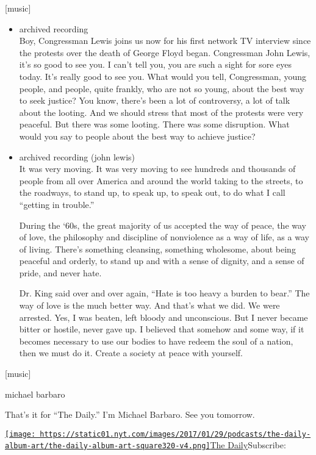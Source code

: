 {[}music{]}

\begin{itemize}
\item
  archived recording\\
  Boy, Congressman Lewis joins us now for his first network TV interview
  since the protests over the death of George Floyd began. Congressman
  John Lewis, it's so good to see you. I can't tell you, you are such a
  sight for sore eyes today. It's really good to see you. What would you
  tell, Congressman, young people, and people, quite frankly, who are
  not so young, about the best way to seek justice? You know, there's
  been a lot of controversy, a lot of talk about the looting. And we
  should stress that most of the protests were very peaceful. But there
  was some looting. There was some disruption. What would you say to
  people about the best way to achieve justice?
\item
  archived recording (john lewis)\\
  It was very moving. It was very moving to see hundreds and thousands
  of people from all over America and around the world taking to the
  streets, to the roadways, to stand up, to speak up, to speak out, to
  do what I call ``getting in trouble.''

  During the `60s, the great majority of us accepted the way of peace,
  the way of love, the philosophy and discipline of nonviolence as a way
  of life, as a way of living. There's something cleansing, something
  wholesome, about being peaceful and orderly, to stand up and with a
  sense of dignity, and a sense of pride, and never hate.

  Dr. King said over and over again, ``Hate is too heavy a burden to
  bear.'' The way of love is the much better way. And that's what we
  did. We were arrested. Yes, I was beaten, left bloody and unconscious.
  But I never became bitter or hostile, never gave up. I believed that
  somehow and some way, if it becomes necessary to use our bodies to
  have redeem the soul of a nation, then we must do it. Create a society
  at peace with yourself.
\end{itemize}

{[}music{]}

michael barbaro

That's it for ``The Daily.'' I'm Michael Barbaro. See you tomorrow.

\href{https://www.nytimes.com/column/the-daily}{\texttt{[image: https://static01.nyt.com/images/2017/01/29/podcasts/the-daily-album-art/the-daily-album-art-square320-v4.png]}The
Daily}Subscribe:

